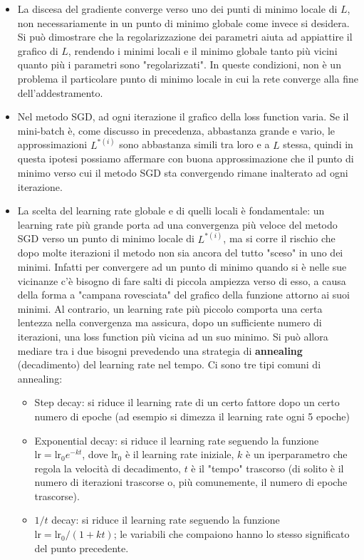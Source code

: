 \begin{itemize}

\item La discesa del gradiente converge verso uno dei punti di minimo locale di $L$, non necessariamente in un punto di minimo globale come invece si desidera. Si può dimostrare che la regolarizzazione dei parametri aiuta ad appiattire il grafico di $L$, rendendo i minimi locali e il minimo globale tanto più vicini quanto più i parametri sono "regolarizzati". In queste condizioni, non è un problema il particolare punto di minimo locale in cui la rete converge alla fine dell'addestramento.

\item Nel metodo SGD, ad ogni iterazione il grafico della loss function varia. Se il mini-batch è, come discusso in precedenza, abbastanza grande e vario, le approssimazioni $L^{*(i)}$ sono abbastanza simili tra loro e a $L$ stessa, quindi in questa ipotesi possiamo affermare con buona approssimazione che il punto di minimo verso cui il metodo SGD sta convergendo rimane inalterato ad ogni iterazione.

\item La scelta del learning rate globale e di quelli locali è fondamentale: un learning rate più grande porta ad una convergenza più veloce del metodo SGD verso un punto di minimo locale di $L^{*(i)}$, ma si corre il rischio che dopo molte iterazioni il metodo non sia ancora del tutto "sceso" in uno dei minimi. Infatti per convergere ad un punto di minimo quando si è nelle sue vicinanze c'è bisogno di fare salti di piccola ampiezza verso di esso, a causa della forma a "campana rovesciata" del grafico della funzione attorno ai suoi minimi. Al contrario, un learning rate più piccolo comporta una certa lentezza nella convergenza ma assicura, dopo un sufficiente numero di iterazioni, una loss function più vicina ad un suo minimo. Si può allora mediare tra i due bisogni prevedendo una strategia di \textbf{annealing} (decadimento) del learning rate nel tempo. Ci sono tre tipi comuni di annealing:

\begin{itemize}

\item Step decay: si riduce il learning rate di un certo fattore dopo un certo numero di epoche (ad esempio si dimezza il learning rate ogni 5 epoche)

\item Exponential decay: si riduce il learning rate seguendo la funzione $\text{lr}=\text{lr}_0 e^{-kt}$, dove $\text{lr}_0$ è il learning rate iniziale, $k$ è un iperparametro che regola la velocità di decadimento, $t$ è il "tempo" trascorso (di solito è il numero di iterazioni trascorse o, più comunemente, il numero di epoche trascorse).

\item $1/t$ decay: si riduce il learning rate seguendo la funzione $\text{lr}=\text{lr}_0 /(1+kt)$; le variabili che compaiono hanno lo stesso significato del punto precedente.

\end{itemize}

\end{itemize}
 
